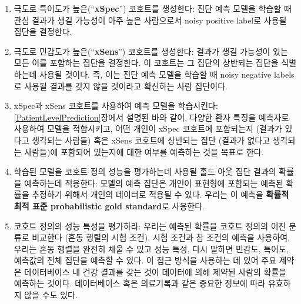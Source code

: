 \documentclass[10.5pt]{book}
\providecommand{\tightlist}{%
  \setlength{\itemsep}{0pt}\setlength{\parskip}{0pt}}
\theoremstyle{definition}
\theoremstyle{definition}
\theoremstyle{definition}
\theoremstyle{remark}
\begin{document}
\begin{enumerate}
\def\labelenumi{\arabic{enumi}.}
\tightlist
\item
  극도로 특이도가 높은(``\textbf{xSpec}'') 코호트를 생성한다: 진단 예측
  모델을 학습할 때 관심 결과가 생길 가능성이 아주 높은 사람으로서 noisy
  positive label로 사용될 집단을 결정한다.
\item
  극도로 민감도가 높은(``\textbf{xSens}'') 코호트를 생성한다: 결과가
  생길 가능성이 있는 모든 이를 포함하는 집단을 결정한다. 이 코호트는 그
  집단의 상반되는 집단을 식별하는데 사용될 것이다. 즉, 이는 진단 예측
  모델을 학습할 때 noisy negative labels로 사용될 결과를 갖지 않을
  것이라고 확신하는 사람 집단이다.
\item
  xSpec과 xSens 코호트를 사용하여 예측 모델을 학습시킨다:
  \ref{PatientLevelPrediction}장에서 설명된 바와 같이, 다양한 환자
  특징을 예측자로 사용하여 모델을 적합시키고, 어떤 개인이 xSpec 코호트에
  포함되는지 (결과가 있다고 생각되는 사람들) 혹은 xSens 코호트에
  상반되는 집단 (결과가 없다고 생각되는 사람들)에 포함되어 있는지에 대한
  여부를 예측하는 것을 목표로 한다.
\item
  학습된 모델을 코호트 정의 성능을 평가하는데 사용될 홀드 아웃 집단
  결과의 확률을 예측하는데 적용한다: 모델의 예측 집단은 개인이 표현형에
  포함되는 예측된 확률을 추정하기 위해서 개인의 데이터로 적용될 수 있다.
  우리는 이 예측을 \textbf{확률적 최적 표준 probabilistic gold
  standard}로 사용한다.
\item
  코호트 정의의 성능 특성을 평가하라: 우리는 예측된 확률을 코호트 정의의
  이진 분류로 비교한다 (혼동 행렬의 시험 조건). 시험 조건과 참 조건의
  예측을 사용하여, 우리는 혼동 행렬을 완전히 채울 수 있고 성능 특성,
  다시 말하면 민감도, 특이도, 예측값의 전체 집단을 예측할 수 있다. 이
  접근 방식을 사용하는 데 있어 주요 제약은 데이터베이스 내 건강 결과를
  갖는 것이 데이터에 의해 제약된 사람의 확률을 예측하는 것이다.
  데이터베이스 혹은 의료기록과 같은 중요한 정보에 따라 유효하지 않을
  수도 있다.
\end{enumerate}
\end{document}
